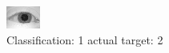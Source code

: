 \begin{figure}[h!]
\begin{center}
\includegraphics[width=0.60\columnwidth]{figures/ID957_class_1_target_2.png}
\end{center}
\caption{ Classification: 1 actual target: 2}
\label{fig:ID957_class_1_target_2}
\end{figure}
